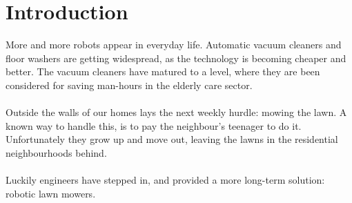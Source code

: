 \chapter{Introduction}
More and more robots appear in everyday life. Automatic vacuum cleaners and floor washers are getting widespread, as the technology is becoming cheaper and better. The vacuum cleaners have matured to a level, where they are been considered for saving man-hours in the elderly care sector. \\\\
Outside the walls of our homes lays the next weekly hurdle: mowing the lawn. A known way to handle this, is to pay the neighbour's teenager to do it. Unfortunately they grow up and move out, leaving the lawns in the residential neighbourhoods behind.\\\\
Luckily engineers have stepped in, and provided a more long-term solution: robotic lawn mowers.